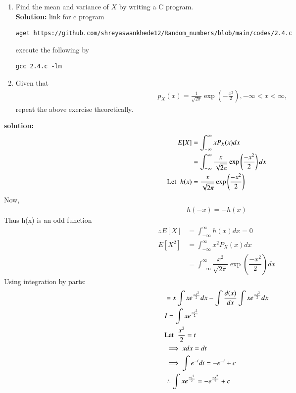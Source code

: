 \documentclass[journal,12pt,twocolumn]{IEEEtran}
\renewcommand\thesection{\arabic{section}}
\providecommand{\brak}[1]{\ensuremath{\left(#1\right)}}
\theoremstyle{remark}
\newcommand{\solution}{\noindent \textbf{Solution: }}
\numberwithin{equation}{section}
\begin{document}
\begin{enumerate}[label=\thesection.\arabic*
,ref=\thesection.\theenumi]
\begin{lstlisting}
\end{lstlisting}
\begin{figure}
\centering
\texttt{[image: 2.3.pdf]}
Fig:2.3  The PDF of X
\end{figure}
\item Find the mean and variance of $X$ by writing a C program.\\
\solution link for c program
\begin{lstlisting}
wget https://github.com/shreyaswankhede12/Random_numbers/blob/main/codes/2.4.c
\end{lstlisting}
execute the following by
\begin{lstlisting}
gcc 2.4.c -lm
\end{lstlisting}
\item Given that 
\begin{align}
p_{X}(x) = \frac{1}{\sqrt{2\pi}}\exp\brak{-\frac{x^2}{2}}, -\infty < x < \infty,
\end{align}
repeat the above exercise theoretically.
\end{enumerate}
\textbf{solution:}
\begin{align}
E[X]&=\int_{-\infty}^{\infty}xP_{X}(x)dx\\
&=\int_{-\infty}^{\infty}\dfrac{x}{\sqrt{2\pi}}\exp\brak{\dfrac{-x^2}{2}}dx\\
\text{Let}\hspace{2mm} h(x)&=\dfrac{x}{\sqrt{2\pi}}\exp\brak{\dfrac{-x^2}{2}}\nonumber
\end{align}
Now,
\begin{align}
h(-x)=-h(x)\nonumber
\end{align}
Thus h(x) is an odd function
\begin{align}
\therefore E[X]&=\int_{-\infty}^{\infty}h(x)dx=0\\
E[X^2]&=\int_{-\infty}^{\infty}x^2P_{X}(x)dx\\
&=\int_{-\infty}^{\infty}\dfrac{x^2}{\sqrt{2\pi}}\exp\brak{\dfrac{-x^2}{2}}dx
\end{align}
Using integration by parts:
  \begin{align}
   \label{eq:eq1}
 & =x\int xe^{\frac{-x^2}{2}} dx-\int\frac{d(x)}{dx} \int xe^{\frac{-x^2}{2}}dx\\
 &I=\int x e^{\frac{-x^2}{2}}\\
 &\text{Let}\hspace{2mm}  \frac{x^2}{2}=t \\
 &\implies x dx=dt\\
 &\implies \int e^{-t} dt=-e^{-t} +c\\
 \label{eq:eq2}
 &\therefore \int x e^{\frac{-x^2}{2}}=-e^{\frac{-x^2}{2}} +c
 \end{align}
\end{document}
